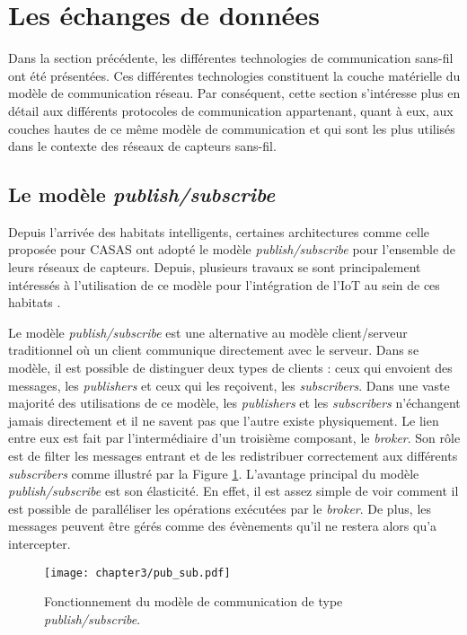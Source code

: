 \section{Les échanges de données}

Dans la section précédente, les différentes technologies de communication sans-fil ont été présentées. Ces différentes technologies constituent la couche matérielle du modèle de communication réseau. Par conséquent, cette section s'intéresse plus en détail aux différents protocoles de communication appartenant, quant à eux, aux couches hautes de ce même modèle de communication et qui sont les plus utilisés dans le contexte des réseaux de capteurs sans-fil.

\subsection{Le modèle \textit{publish/subscribe}}

Depuis l'arrivée des habitats intelligents, certaines architectures comme celle proposée pour CASAS \citep{Cook2013} ont adopté le modèle \textit{publish/subscribe} pour l'ensemble de leurs réseaux de capteurs. Depuis, plusieurs travaux se sont principalement intéressés à l'utilisation de ce modèle pour l'intégration de l'\acs{IoT} au sein de ces habitats \citep{Lee2014, Upadhyay2016, VandenBossche2018}.

Le modèle \textit{publish/subscribe} est une alternative au modèle client/serveur traditionnel où un client communique directement avec le serveur. Dans se modèle, il est possible de distinguer deux types de clients : ceux qui envoient des messages, les \textit{publishers} et ceux qui les reçoivent, les \textit{subscribers}. Dans une vaste majorité des utilisations de ce modèle, les \textit{publishers} et les \textit{subscribers} n'échangent jamais directement et il ne savent pas que l'autre existe physiquement. Le lien entre eux est fait par l'intermédiaire d'un troisième composant, le \textit{broker}. Son rôle est de filter les messages entrant et de les redistribuer correctement aux différents \textit{subscribers} comme illustré par la Figure \ref{fig:pub_sub}. L'avantage principal du modèle \textit{publish/subscribe} est son élasticité. En effet, il est assez simple de voir comment il est possible de paralléliser les opérations exécutées par le \textit{broker}. De plus, les messages peuvent être gérés comme des évènements qu'il ne restera alors qu'a intercepter.

\begin{figure}[H]
	\centering
	\texttt{[image: chapter3/pub\_sub.pdf]}
        \caption{Fonctionnement du modèle de communication de type \textit{publish/subscribe}.}
	\label{fig:pub_sub}
\end{figure}

